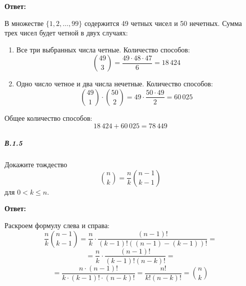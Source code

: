 \textbf{Ответ:}

В множестве $\{1, 2, \dots, 99\}$ содержится 49 четных чисел и 50 нечетных. Сумма трех чисел будет четной в двух случаях:
\begin{enumerate}
    \item Все три выбранных числа четные. Количество способов:
    \[ \binom{49}{3} = \frac{49 \cdot 48 \cdot 47}{6} = 18\,424 \]
    \item Одно число четное и два числа нечетные. Количество способов:
    \[ \binom{49}{1} \cdot \binom{50}{2} = 49 \cdot \frac{50 \cdot 49}{2} = 60\,025 \]
\end{enumerate}
Общее количество способов:
\[ 18\,424 + 60\,025 = 78\,449 \]

\subparagraph{В.1.5}
Докажите тождество
\[ \binom{n}{k} = \frac{n}{k} \binom{n-1}{k-1} \]
для $0 < k \le n$.

\textbf{Ответ:}

Раскроем формулу слева и справа:
\[ 
\frac{n}{k} \binom{n-1}{k-1} = \frac{n}{k} \cdot \frac{(n-1)!}{(k-1)!((n-1)-(k-1))!} = 
\]
\[ 
= \frac{n}{k} \cdot \frac{(n-1)!}{(k-1)!(n-k)!} = 
\]
\[ 
= \frac{n \cdot (n-1)!}{k \cdot (k-1)! \cdot (n-k)!} = \frac{n!}{k!(n-k)!} = \binom{n}{k}
\]

